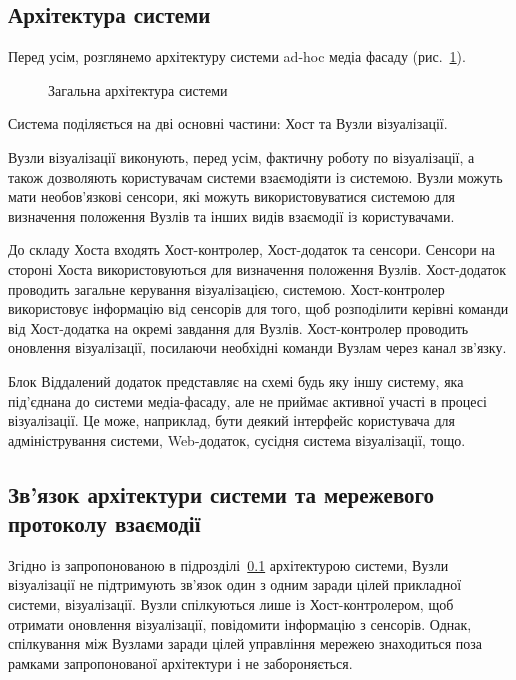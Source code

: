 \documentclass[a4paper,ukrainian,utf8,nocolumnsxix,floatsection,equationsection]{eskdtext}
\newcommand{\figref}[1]{рис.~\ref{#1}}
\begin{document}
\subsection{Архітектура системи}
\label{sub:system:arch}

Перед усім, розглянемо архітектуру системи ad-hoc медіа фасаду (\figref{fig:sys_arch}). 

\begin{figure}[bth]
\centering
{}
\caption{\label{fig:sys_arch}Загальна архітектура системи}
\end{figure}

Система поділяється на дві основні частини: Хост та Вузли візуалізації.

Вузли візуалізації виконують, перед усім, фактичну роботу по візуалізації, а також дозволяють користувачам системи взаємодіяти із системою. Вузли можуть мати необов’язкові сенсори, які можуть використовуватися системою для визначення положення Вузлів та інших видів взаємодії із користувачами.

До складу Хоста входять Хост-контролер, Хост-додаток та сенсори. Сенсори на стороні Хоста використовуються для визначення положення Вузлів. Хост-додаток проводить загальне керування візуалізацією, системою. Хост-контролер використовує інформацію від сенсорів для того, щоб розподілити керівні команди від Хост-додатка на окремі завдання для Вузлів. Хост-контролер проводить оновлення візуалізації, посилаючи необхідні команди Вузлам через канал зв’язку.

Блок Віддалений додаток представляє на схемі будь яку іншу систему, яка під’єднана до системи медіа-фасаду, але не приймає активної участі в процесі візуалізації. Це може, наприклад, бути деякий інтерфейс користувача для адміністрування системи, Web-додаток, сусідня система візуалізації, тощо.

\subsection{Зв’язок архітектури системи та мережевого протоколу взаємодії}

Згідно із запропонованою в підрозділі~\ref{sub:system:arch} архітектурою системи, Вузли візуалізації не підтримують зв’язок один з одним заради цілей прикладної системи, візуалізації. Вузли спілкуються лише із Хост-контролером, щоб отримати оновлення візуалізації, повідомити інформацію з сенсорів. Однак, спілкування між Вузлами заради цілей управління мережею знаходиться поза рамками запропонованої архітектури і не забороняється.
\end{document}
